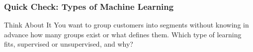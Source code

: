 




\begin{frame}[fragile]\frametitle{Quick Check: Types of Machine Learning}
\begin{block}{Think About It}
You want to group customers into segments without knowing in advance how many groups exist or what defines them. Which type of learning fits, supervised or unsupervised, and why?
\end{block}
\end{frame}

